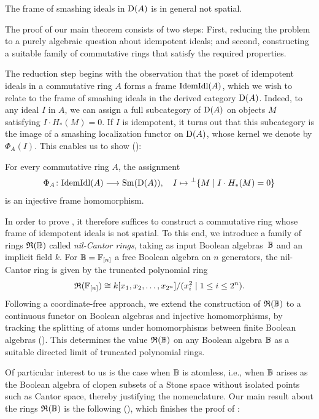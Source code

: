 \documentclass{amsart}
\begin{document}
    \begin{MainThm}\label{mainthm:main}
        The frame of smashing ideals in $\operatorname{D}(A)$ is in general not spatial. 
    \end{MainThm}

    The proof of our main theorem consists of two steps: First, reducing the problem to a purely algebraic question about idempotent ideals; and second, constructing a suitable family of commutative rings that satisfy the required properties. 

    The reduction step begins with the observation that the poset of idempotent ideals in a commutative ring $A$ forms a frame $\mathrm{IdemIdl}(A)$, which we wish to relate to the frame of smashing ideals in the derived category $\operatorname{D}(A)$. Indeed, to any ideal $I$ in $A$, we can assign a full subcategory of $\operatorname{D}(A)$ on objects $M$ satisfying $I \cdot H_*(M)  = 0$. If $I$ is idempotent, it turns out that this subcategory is the image of a smashing localization functor on $\operatorname{D}(A)$, whose kernel we denote by $\Phi_A(I)$. This enables us to show ():
    \begin{MainThm}\label{mainthm:smashing}
        For every commutative ring $A$, the assignment
        \[
            \Phi_A\colon \mathrm{IdemIdl}(A)\longrightarrow\operatorname{Sm}(\operatorname{D}(A)), \quad I \mapsto {}^{\perp}\{M\mid I\cdot H_*(M)=0\}
        \]
        is an injective frame homomorphism.
    \end{MainThm}
    
    In order to prove , it therefore suffices to construct a commutative ring whose frame of idempotent ideals is not spatial. To this end, we introduce a family of rings $\mathfrak{R}(\mathbb{B})$ called \emph{nil-Cantor rings}, taking as input Boolean algebras~$\mathbb{B}$ and an implicit field $k$. For $\mathbb{B} = \mathbb{F}_{[n]}$ a free Boolean algebra on $n$ generators, the nil-Cantor ring is given by the truncated polynomial ring
        \[
            \mathfrak{R}(\mathbb{F}_{[n]}) \cong k[x_1,x_2,\ldots,x_{2^n}]/(x_i^2 \mid 1 \leq i \leq 2^n).
        \]
    Following a coordinate-free approach, we extend the construction of $\mathfrak{R}(\mathbb{B})$ to a continuous functor on Boolean algebras and injective homomorphisms, by tracking the splitting of atoms under homomorphisms between finite Boolean algebras (). This determines the value $\mathfrak{R}(\mathbb{B})$ on any Boolean algebra $\mathbb{B}$ as a suitable directed limit of truncated polynomial rings. 
    
    Of particular interest to us is the case when $\mathbb{B}$ is atomless, i.e., when $\mathbb{B}$ arises as the Boolean algebra of clopen subsets of a Stone space without isolated points such as Cantor space, thereby justifying the nomenclature. Our main result about the rings $\mathfrak{R}(\mathbb{B})$ is the following (), which finishes the proof of :
\end{document}

